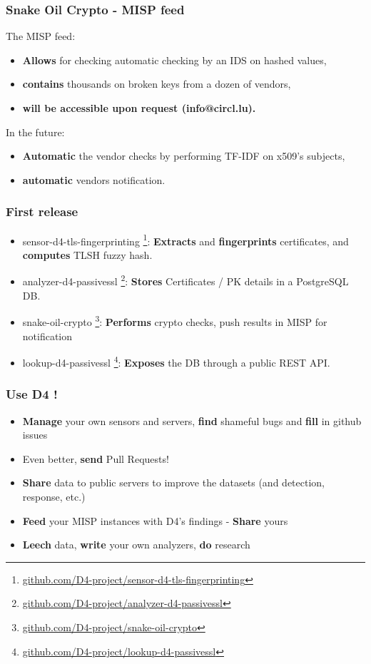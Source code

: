 \documentclass{beamer}
\begin{document}
\begin{frame}
   \frametitle{Snake Oil Crypto - MISP feed}
   The MISP feed:
   \begin{itemize}
     \item {\bf Allows} for checking automatic checking by an IDS on hashed values,
     \item {\bf contains} thousands on broken keys from a dozen of vendors,
     \item {\bf will be accessible upon request (info@circl.lu).}
   \end{itemize}

   In the future:
    \begin{itemize}
     \item {\bf Automatic} the vendor checks by performing TF-IDF on x509's subjects, 
     \item {\bf automatic} vendors notification.
     \end{itemize}

\end{frame}


\begin{frame}
  \frametitle{First release}
  \begin{itemize}
  \item[\checkmark] sensor-d4-tls-fingerprinting
    \footnote{\url{github.com/D4-project/sensor-d4-tls-fingerprinting}}:
    {\bf Extracts} and {\bf fingerprints} certificates, and {\bf computes} TLSH fuzzy hash.
  \item[\checkmark] analyzer-d4-passivessl
    \footnote{\url{github.com/D4-project/analyzer-d4-passivessl}}:
    {\bf Stores} Certificates / PK details in a PostgreSQL DB.
  \item snake-oil-crypto 
    \footnote{\url{github.com/D4-project/snake-oil-crypto}}:
    {\bf Performs} crypto checks, push results in MISP for notification
  \item lookup-d4-passivessl
    \footnote{\url{github.com/D4-project/lookup-d4-passivessl}}:
    {\bf Exposes} the DB through a public REST API.
  \end{itemize}
\end{frame}

\begin{frame}
\frametitle{Use D4 !}
\begin{itemize}
\item {\bf Manage} your own sensors and servers, {\bf find} shameful bugs and
  {\bf fill} in github issues
\item Even better, {\bf send} Pull Requests! 
\item {\bf Share} data to public servers to improve the datasets (and detection,
  response, etc.)
\item {\bf Feed} your MISP instances with D4's findings - {\bf Share} yours
\item {\bf Leech} data, {\bf write} your own analyzers, {\bf do} research
\end{itemize}
\end{frame}
\end{document}
